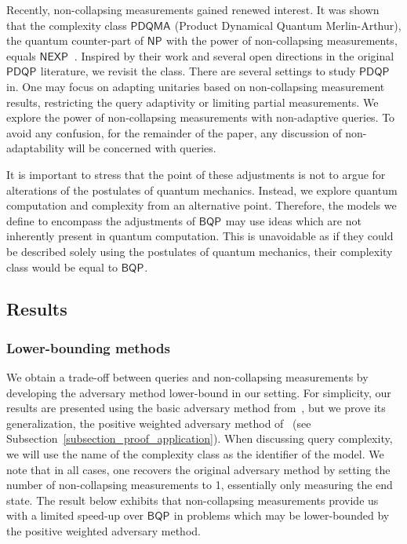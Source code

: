 \documentclass[10pt,a4paper]{article}
\newcommand{\compclass}[2][]{\ensuremath{\mathsf{#2}^{#1}}\xspace}
\newcommand{\pdqpname}[0]{\compclass{PDQP}}
\newcommand{\bqpname}[0]{\compclass{BQP}}
\begin{document}
Recently, non-collapsing measurements gained renewed interest. It was shown that the complexity class \compclass{PDQMA} (Product Dynamical Quantum Merlin-Arthur), the quantum counter-part of \compclass{NP} with the power of non-collapsing measurements, equals \compclass{NEXP}~\cite{pdqma_equals_nexp, pdqma_single}. Inspired by their work and several open directions in the original \pdqpname literature, we revisit the class. 
There are several settings to study \pdqpname in. One may focus on adapting unitaries based on non-collapsing measurement results, restricting the query adaptivity or limiting partial measurements. We explore the power of non-collapsing measurements with non-adaptive queries. To avoid any confusion, for the remainder of the paper, any discussion of non-adaptability will be concerned with queries.

It is important to stress that the point of these adjustments is not to argue for alterations of the postulates of quantum mechanics. Instead, we explore quantum computation and complexity from an alternative point. Therefore, the models we define to encompass the adjustments of \bqpname may use ideas which are not inherently present in quantum computation. This is unavoidable as if they could be described solely using the postulates of quantum mechanics, their complexity class would be equal to \bqpname.

\subsection{Results}\label{subsection_results}

\subsubsection{Lower-bounding methods}

We obtain a trade-off between queries and non-collapsing measurements by developing the adversary method lower-bound in our setting. For simplicity, our results are presented using the basic adversary method from~\cite{adversary_original}, but we prove its generalization, the positive weighted adversary method of~\cite{weighted_adversary} (see Subsection~\ref{subsection_proof_application}). When discussing query complexity, we will use the name of the complexity class as the identifier of the model. We note that in all cases, one recovers the original adversary method by setting the number of non-collapsing measurements to 1, essentially only measuring the end state. The result below exhibits that non-collapsing measurements provide us with a limited speed-up over \bqpname in problems which may be lower-bounded by the positive weighted adversary method.
\end{document}
